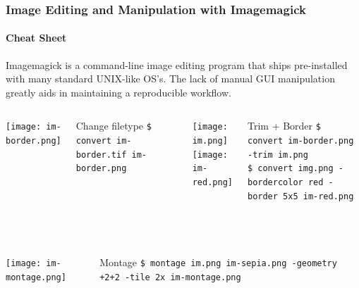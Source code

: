 \documentclass[hyperref={colorlinks,citecolor=pink,linkcolor=red,urlcolor=blue}]{beamer}
\newcommand\Fontvii{\fontsize{7pt}{7.2}\selectfont}
\begin{document}
\begin{frame}
\frametitle{Image Editing and Manipulation with Imagemagick}
\framesubtitle{Cheat Sheet}
\Fontvii
\vspace{-20.5pt}

\begin{exampleblock}{}
Imagemagick is a command-line image editing program that ships pre-installed with many standard UNIX-like OS's. The lack of manual GUI manipulation greatly aids in maintaining a reproducible workflow.
\end{exampleblock}
\vspace{8.5pt}

\begin{minipage}[0.2\textheight]{\textwidth}
	\begin{columns}[T]
			\texttt{[image: im-border.png]}\\
			\begin{exampleblock}{Change filetype}
				\texttt{\$ convert im-border.tif im-border.png}
			\end{exampleblock}	
			\texttt{[image: im.png]}\\
			\texttt{[image: im-red.png]}
			\begin{exampleblock}{Trim + Border}
				\texttt{\$ convert im-border.png -trim im.png}\\
				\texttt{\$ convert img.png -bordercolor red -border 5x5 im-red.png}
			\end{exampleblock}	
	\end{columns}
\end{minipage}\\


\begin{minipage}[0.2\textheight]{\textwidth}
	\begin{columns}[T]
			\texttt{[image: im-montage.png]}\\
			\begin{exampleblock}{Montage}
				\texttt{\$ montage im.png im-sepia.png -geometry +2+2 -tile 2x im-montage.png}\\
			\end{exampleblock}	
	\end{columns}
\end{minipage}


\end{frame}
\end{document}
